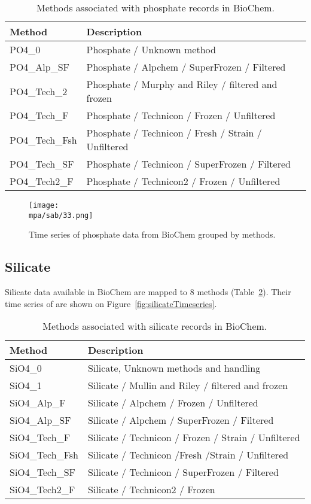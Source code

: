 \documentclass[letterpaper,portrait,11pt]{scrartcl}
\numberwithin{equation}{section}		%
\numberwithin{figure}{section}		%
\numberwithin{table}{section}				%
\newcommand*{\D}{.}
\newcommand{\biodata}{\string~/bio\D data}   %
\newcommand{\mpa}{\biodata/bio\D indicators/mpa}  %
\begin{document}
\begin{appendices}
\begin{table}[h]
  \caption{Methods associated with phosphate records in BioChem.}
  \label{table:PhosphateMethods}
  \begin{tabular}{ll}
    Method & Description \\ \hline
    PO4\_0 & Phosphate / Unknown method  \\ 
    PO4\_Alp\_SF & Phosphate / Alpchem / SuperFrozen / Filtered \\ 
    PO4\_Tech\_2 & Phosphate / Murphy and Riley / filtered and frozen \\ 
    PO4\_Tech\_F & Phosphate / Technicon / Frozen / Unfiltered \\ 
    PO4\_Tech\_Fsh & Phosphate / Technicon / Fresh / Strain / Unfiltered \\
    PO4\_Tech\_SF & Phosphate / Technicon / SuperFrozen / Filtered \\
    PO4\_Tech2\_F & Phosphate / Technicon2 / Frozen / Unfiltered \\
  \end{tabular}
\end{table}


\begin{figure}[h]
  \centering
  \texttt{[image: \\mpa/sab/33.png]}
  \caption{Time series of phosphate data from BioChem grouped by methods.}
  \label{fig:PhosphateTimeseries}
\end{figure}


\subsection{Silicate}

Silicate data available in BioChem are mapped to 8 methods (Table~\ref{table:SilicateMethods}). Their time series of are shown on Figure~\ref{fig:silicateTimeseries}.

\begin{table}[h]
  \label{table:SilicateMethods}
  \caption{Methods associated with silicate records in BioChem.}
  \begin{tabular}{ll}
    Method & Description \\ \hline
    SiO4\_0 & Silicate, Unknown methods and handling \\
    SiO4\_1 & Silicate / Mullin and Riley / filtered and frozen \\
    SiO4\_Alp\_F & Silicate / Alpchem / Frozen / Unfiltered \\
    SiO4\_Alp\_SF & Silicate / Alpchem / SuperFrozen / Filtered \\
    SiO4\_Tech\_F & Silicate / Technicon / Frozen / Strain / Unfiltered \\
    SiO4\_Tech\_Fsh & Silicate / Technicon /Fresh /Strain / Unfiltered \\
    SiO4\_Tech\_SF & Silicate / Technicon / SuperFrozen / Filtered \\
    SiO4\_Tech2\_F & Silicate / Technicon2 / Frozen \\
  \end{tabular}
\end{table}



\end{appendices}
\end{document}
